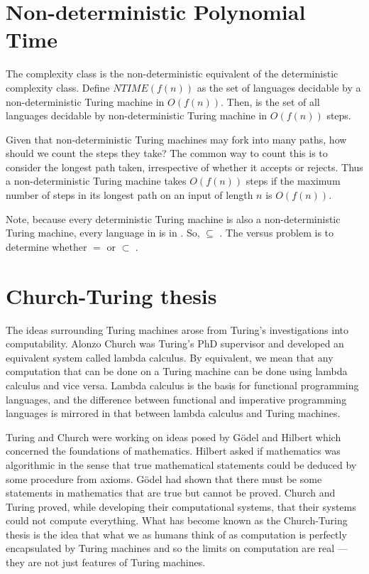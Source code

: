 \documentclass{iansnotes}
\begin{document}
\section{Non-deterministic Polynomial Time}
  The  complexity class is the non-deterministic equivalent of the deterministic  complexity class.
  Define $NTIME(f(n))$ as the set of languages decidable by a non-deterministic Turing machine in $O(f(n))$.
  Then,  is the set of all languages decidable by non-deterministic Turing machine in $O(f(n))$ steps.

  Given that non-deterministic Turing machines may fork into many paths, how should we count the steps they take?
  The common way to count this is to consider the longest path taken, irrespective of whether it accepts or rejects.
  Thus a non-deterministic Turing machine takes \(O(f(n))\) steps if the maximum number of steps in its longest path on an input of length \(n\) is \(O(f(n))\).

  Note, because every deterministic Turing machine is also a non-deterministic Turing machine, every language in  is in .
  So,  $\subseteq$ .
  The  versus  problem is to determine whether  $=$  or  $\subset$ .

\section{Church-Turing thesis}
  The ideas surrounding Turing machines arose from Turing's investigations into computability.
  Alonzo Church was Turing's PhD supervisor and developed an equivalent system called lambda calculus.
  By equivalent, we mean that any computation that can be done on a Turing machine can be done using lambda calculus and vice versa.
  Lambda calculus is the basis for functional programming languages, and the difference between functional and imperative programming languages is mirrored in that between lambda calculus and Turing machines.
  
  Turing and Church were working on ideas posed by G{\"o}del and Hilbert which concerned the foundations of mathematics.
  Hilbert asked if mathematics was algorithmic in the sense that true mathematical statements could be deduced by some procedure from axioms.
  G{\"o}del had shown that there must be some statements in mathematics that are true but cannot be proved.
  Church and Turing proved, while developing their computational systems, that their systems could not compute everything.
  What has become known as the Church-Turing thesis is the idea that what we as humans think of as computation is perfectly encapsulated by Turing machines and so the limits on computation are real --- they are not just features of Turing machines.
\end{document}
